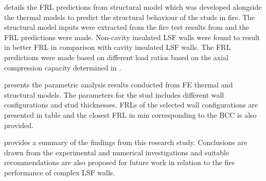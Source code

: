 \textbf{} details the FRL predictions from structural model which was developed alongside the thermal models to predict the structural behaviour of the studs in fire. The structural model inputs were extracted from the fire test results from  and the FRL predictions were made. Non-cavity insulated LSF walls were found to result in better FRL in comparison with cavity insulated LSF walls. The FRL predictions were made based on different load ratios based on the axial compression capacity determined in .

\textbf{} presents the parametric analysis results conducted from FE thermal and structural models. The parameters for the stud includes different wall configurations and stud thicknesses. FRLs of the selected wall configurations are presented in table and the closest FRL in min corresponding to the BCC is also provided. 


\textbf{} provides a summary of the findings from this research study. Conclusions are drawn from the experimental and numerical investigations and suitable recommendations are also proposed for future work in relation to the fire performance of complex LSF walls.


